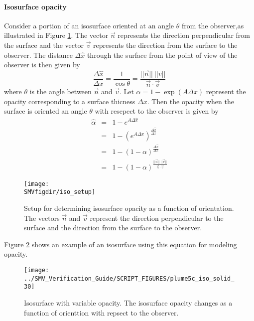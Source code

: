 \documentclass[11pt,twoside]{book}
\begin{document}
\paragraph{Isosurface opacity}Consider a portion of an isosurface oriented at an angle $\theta$ from
the observer,as illustrated in Figure \ref{fig:isosetup}.  The vector $\vec{n}$ represents the direction
perpendicular from the surface and the vector $\vec{v}$ represents the direction from the surface to the observer.
The distance $\Delta\hat{x}$ through the surface from the point of view
of the observer is then given by
\begin{equation}
\frac{\Delta \hat{x}}{\Delta x}=\frac{1}{\cos\theta}=
\frac{||\vec{n}||~||v||}{\vec{n}\cdot\vec{v}}
\end{equation}
\noindent where $\theta$ is the angle between $\vec{n}$ and $\vec{v}$.
Let $\alpha=1-\exp(A\Delta x)$ represent the opacity corresponding to
a surface thicness $\Delta x$.  Then the opacity when the surface is
oriented an angle $\theta$ with resepect to the observer is given by
\begin{eqnarray*}
\hat{\alpha}&=&1-e^{A\Delta\hat{x}}\\
&=&1-(e^{A\Delta x})^\frac{\Delta \hat{x}}{\Delta x}\\
&=&1-(1-\alpha)^\frac{\Delta\hat{x}}{\Delta x}\\
&=&1-(1-\alpha)^\frac{||\vec{n}||~||\vec{v}||}{\vec{n}\cdot\vec{v}}
\end{eqnarray*}


\begin{figure}[bph]
\begin{center}
\texttt{[image: \\SMVfigdir/iso\_setup]}
\end{center}
\caption[Setup for determining isosurface opacity as a function of orientation.]
{Setup for determining isosurface opacity as a function of orientation.
The vectors $\vec{n}$ and $\vec{v}$ represent the direction perpendicular to the surface
and the direction from the surface to the observer.}

\label{fig:isosetup}%
\end{figure}

Figure \ref{fig:isoexample} shows an example of an isosurface using this equation for modeling opacity.

\begin{figure}[bph]
\begin{center}
\texttt{[image: ../SMV\_Verification\_Guide/SCRIPT\_FIGURES/plume5c\_iso\_solid\_30]}
\end{center}
\caption
{Isosurface with variable opacity. The isosurface opacity changes as a function of orienttion
with repsect to the observer.}

\label{fig:isoexample}%
\end{figure}
\end{document}
